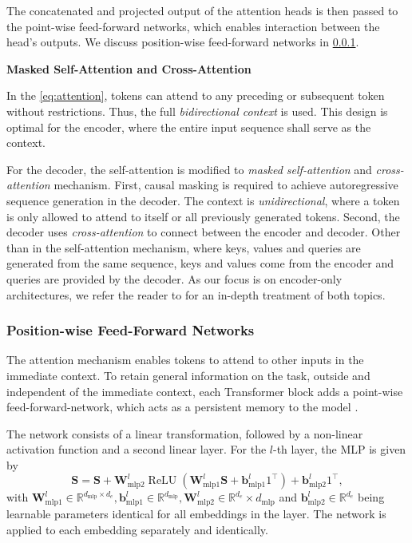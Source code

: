 The concatenated and projected output of the attention heads is then passed to the point-wise feed-forward networks, which enables interaction between the head's outputs. We discuss position-wise feed-forward networks in \cref{sec:position-wise-ffn}.

\textbf{Masked Self-Attention and Cross-Attention}

In the \cref{eq:attention}, tokens can attend to any preceding or subsequent token without restrictions. Thus, the full \emph{bidirectional context} is used. This design is optimal for the encoder, where the entire input sequence shall serve as the context.

For the decoder, the self-attention is modified to \emph{masked self-attention} and \emph{cross-attention} mechanism. First, causal masking is required to achieve autoregressive sequence generation in the decoder. The context is \emph{unidirectional}, where a token is only allowed to attend to itself or all previously generated tokens. Second, the decoder uses \emph{cross-attention} to connect between the encoder and decoder. Other than in the self-attention mechanism, where keys, values and queries are generated from the same sequence, keys and values come from the encoder and queries are provided by the decoder. As our focus is on encoder-only architectures, we refer the reader to \textcite[][16--17]{raffelExploringLimitsTransfer2020} for an in-depth treatment of both topics.

\subsubsection{Position-wise Feed-Forward Networks}\label{sec:position-wise-ffn}

The attention mechanism enables \glspl{token} to attend to other inputs in the immediate context. To retain general information on the task, outside and independent of the immediate context, each Transformer block adds a point-wise \gls{feed-forward-network}, which acts as a persistent memory to the model \autocite[][3]{sukhbaatarAugmentingSelfattentionPersistent2019}.

The network consists of a linear transformation, followed by a non-linear activation function and a second linear layer. For the $l$-th layer, the \gls{MLP} is given by
\begin{equation}
    \mathbf{S} = \mathbf{S}+\mathbf{W}_{\mathrm{mlp} 2}^l \operatorname{ReLU}\left(\mathbf{W}_{\mathrm{mlp} 1}^l \mathbf{S}+\mathbf{b}_{\mathrm{mlp} 1}^l 1^{\top}\right)+\mathbf{b}_{\mathrm{mlp} 2}^l 1^{\top},
\end{equation}
with $\mathbf{W}_{\mathrm{mlp} 1}^l \in \mathbb{R}^{d_{\mathrm{mlp}} \times d_{e}}, \mathbf{b}_{\mathrm{mlp} 1}^l \in \mathbb{R}^{d_{\mathrm{mlp}}}, \mathbf{W}_{\mathrm{mlp} 2}^l \in \mathbb{R}^{d_{e}} \times d_{\mathrm{mlp}}$ and $\mathbf{b}_{\mathrm{mlp} 2}^l \in \mathbb{R}^{d_{e}}$ being learnable parameters identical for all \glspl{embedding} in the layer. The network is applied to each embedding separately and identically.

